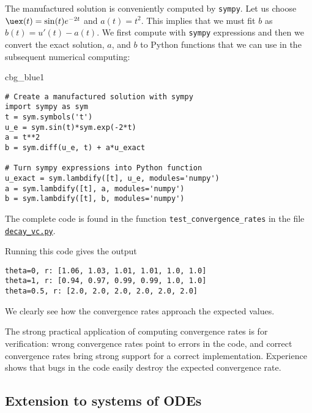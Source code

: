 \documentclass[graybox,sectrefs,envcountresetchap,open=right,final]{svmonodo}
\newenvironment{_cod_tight}[1]{
   \def\FrameCommand{\colorbox{#1}}
   \FrameRule0.6pt\MakeFramed {\FrameRestore}\vskip3mm}
   {\vskip0mm\endMakeFramed}
\newenvironment{cod}[1]{
\bgroup\rmfamily
\fboxsep=0mm\relax
\begin{_cod_tight}{#1}
\list{}{\parsep=-2mm\parskip=0mm\topsep=0pt\leftmargin=2mm
\rightmargin=2\leftmargin\leftmargin=4pt\relax}
\item\relax}
{\endlist\end{_cod_tight}\egroup}
\newenvironment{notice_mdfboxadmon}[1][]{
\begin{notice_mdfboxmdframed}[frametitle=#1]
}
{
\end{notice_mdfboxmdframed}
}
\begin{document}
The manufactured solution is conveniently computed by \texttt{sympy}.
Let us choose $\uex(t) = \sin(t)e^{-2t}$ and $a(t)=t^2$.
This implies that we must fit $b$ as $b(t)=u'(t)-a(t)$.
We first compute with \texttt{sympy} expressions and then we convert
the exact solution, $a$, and $b$ to Python functions that we
can use in the subsequent numerical computing:

\begin{cod}{cbg_blue1}\begin{Verbatim}[numbers=none,fontsize=\fontsize{9pt}{9pt},baselinestretch=0.95,xleftmargin=2mm]
# Create a manufactured solution with sympy
import sympy as sym
t = sym.symbols('t')
u_e = sym.sin(t)*sym.exp(-2*t)
a = t**2
b = sym.diff(u_e, t) + a*u_exact

# Turn sympy expressions into Python function
u_exact = sym.lambdify([t], u_e, modules='numpy')
a = sym.lambdify([t], a, modules='numpy')
b = sym.lambdify([t], b, modules='numpy')
\end{Verbatim}
\end{cod}
\noindent
The complete code is found in the function \Verb!test_convergence_rates!
in the file \href{{http://tinyurl.com/ofkw6kc/genz/decay_vc.py}}{\nolinkurl{decay_vc.py}}.

Running this code gives the output

\begin{Verbatim}[frame=lines,label=\fbox{{\tiny Terminal}},framesep=2.5mm,framerule=0.7pt,fontsize=\fontsize{9pt}{9pt}]
theta=0, r: [1.06, 1.03, 1.01, 1.01, 1.0, 1.0]
theta=1, r: [0.94, 0.97, 0.99, 0.99, 1.0, 1.0]
theta=0.5, r: [2.0, 2.0, 2.0, 2.0, 2.0, 2.0]
\end{Verbatim}
We clearly see how the convergence rates approach the expected values.



\begin{notice_mdfboxadmon}
The strong practical application of computing convergence rates is for
verification: wrong convergence rates point to errors in the code, and
correct convergence rates bring strong support for a correct implementation.
Experience shows that bugs in the code easily destroy the
expected convergence rate.
\end{notice_mdfboxadmon}





\subsection{Extension to systems of ODEs}
\end{document}
